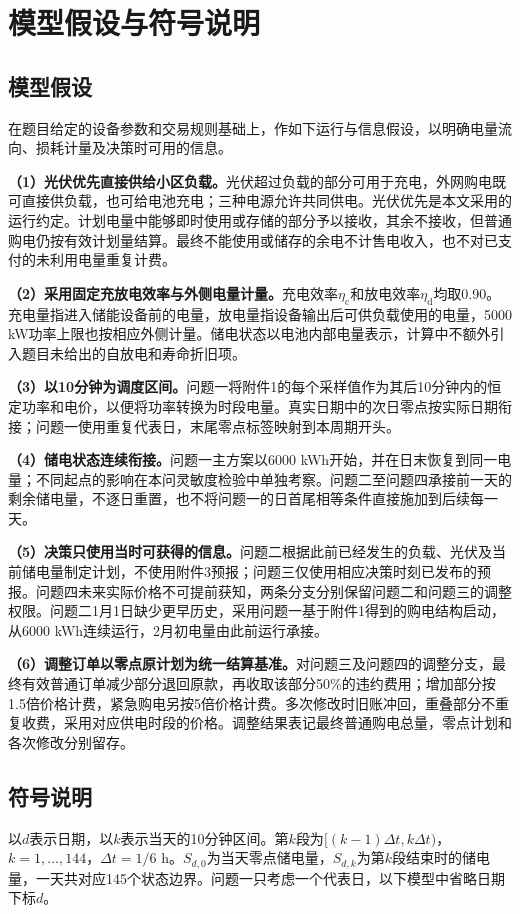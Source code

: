 \section{模型假设与符号说明}
\subsection{模型假设}
在题目给定的设备参数和交易规则基础上，作如下运行与信息假设，以明确电量流向、损耗计量及决策时可用的信息。

\textbf{（1）光伏优先直接供给小区负载。}光伏超过负载的部分可用于充电，外网购电既可直接供负载，也可给电池充电；三种电源允许共同供电。光伏优先是本文采用的运行约定。计划电量中能够即时使用或存储的部分予以接收，其余不接收，但普通购电仍按有效计划量结算。最终不能使用或储存的余电不计售电收入，也不对已支付的未利用电量重复计费。

\textbf{（2）采用固定充放电效率与外侧电量计量。}充电效率$\eta_{\mathrm c}$和放电效率$\eta_{\mathrm d}$均取0.90。充电量指进入储能设备前的电量，放电量指设备输出后可供负载使用的电量，5000 kW功率上限也按相应外侧计量。储电状态以电池内部电量表示，计算中不额外引入题目未给出的自放电和寿命折旧项。

\textbf{（3）以10分钟为调度区间。}问题一将附件1的每个采样值作为其后10分钟内的恒定功率和电价，以便将功率转换为时段电量。真实日期中的次日零点按实际日期衔接；问题一使用重复代表日，末尾零点标签映射到本周期开头。

\textbf{（4）储电状态连续衔接。}问题一主方案以6000 kWh开始，并在日末恢复到同一电量；不同起点的影响在本问灵敏度检验中单独考察。问题二至问题四承接前一天的剩余储电量，不逐日重置，也不将问题一的日首尾相等条件直接施加到后续每一天。

\textbf{（5）决策只使用当时可获得的信息。}问题二根据此前已经发生的负载、光伏及当前储电量制定计划，不使用附件3预报；问题三仅使用相应决策时刻已发布的预报。问题四未来实际价格不可提前获知，两条分支分别保留问题二和问题三的调整权限。问题二1月1日缺少更早历史，采用问题一基于附件1得到的购电结构启动，从6000 kWh连续运行，2月初电量由此前运行承接。

\textbf{（6）调整订单以零点原计划为统一结算基准。}对问题三及问题四的调整分支，最终有效普通订单减少部分退回原款，再收取该部分50\%的违约费用；增加部分按1.5倍价格计费，紧急购电另按5倍价格计费。多次修改时旧账冲回，重叠部分不重复收费，采用对应供电时段的价格。调整结果表记最终普通购电总量，零点计划和各次修改分别留存。

\subsection{符号说明}
以$d$表示日期，以$k$表示当天的10分钟区间。第$k$段为$[(k-1)\Delta t,k\Delta t)$，$k=1,\ldots,144$，$\Delta t=1/6$ h。$S_{d,0}$为当天零点储电量，$S_{d,k}$为第$k$段结束时的储电量，一天共对应145个状态边界。问题一只考虑一个代表日，以下模型中省略日期下标$d$。

